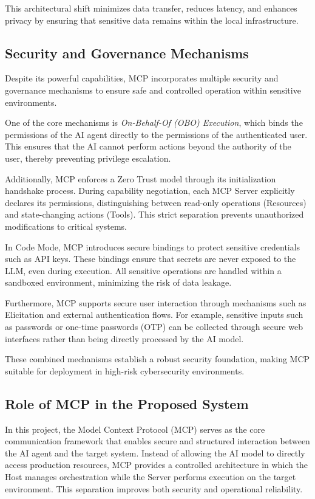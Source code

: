 \documentclass[12pt]{report}
\begin{document}
This architectural shift minimizes data transfer, reduces latency, and enhances privacy by ensuring that sensitive data remains within the local infrastructure.

\subsection{Security and Governance Mechanisms}

Despite its powerful capabilities, MCP incorporates multiple security and governance mechanisms to ensure safe and controlled operation within sensitive environments.

One of the core mechanisms is \textit{On-Behalf-Of (OBO) Execution}, which binds the permissions of the AI agent directly to the permissions of the authenticated user. This ensures that the AI cannot perform actions beyond the authority of the user, thereby preventing privilege escalation.

Additionally, MCP enforces a Zero Trust model through its initialization handshake process. During capability negotiation, each MCP Server explicitly declares its permissions, distinguishing between read-only operations (Resources) and state-changing actions (Tools). This strict separation prevents unauthorized modifications to critical systems.

In Code Mode, MCP introduces secure bindings to protect sensitive credentials such as API keys. These bindings ensure that secrets are never exposed to the LLM, even during execution. All sensitive operations are handled within a sandboxed environment, minimizing the risk of data leakage.

Furthermore, MCP supports secure user interaction through mechanisms such as Elicitation and external authentication flows. For example, sensitive inputs such as passwords or one-time passwords (OTP) can be collected through secure web interfaces rather than being directly processed by the AI model.

These combined mechanisms establish a robust security foundation, making MCP suitable for deployment in high-risk cybersecurity environments.

\subsection{Role of MCP in the Proposed System}

In this project, the Model Context Protocol (MCP) serves as the core communication framework that enables secure and structured interaction between the AI agent and the target system. Instead of allowing the AI model to directly access production resources, MCP provides a controlled architecture in which the Host manages orchestration while the Server performs execution on the target environment. This separation improves both security and operational reliability.
\end{document}
